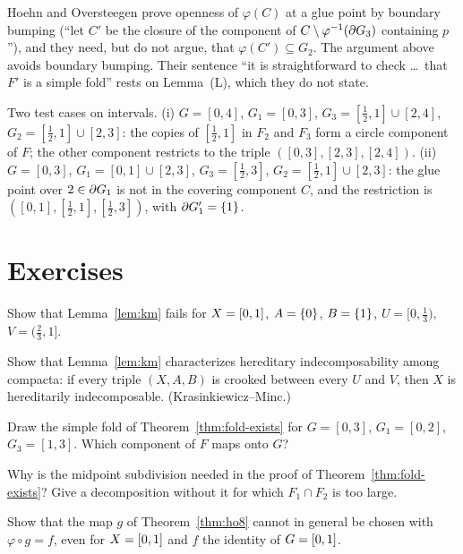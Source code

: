
Hoehn and Oversteegen prove openness of $\varphi(C)$ at a glue point by boundary bumping (``let $C'$ be the closure of the component of $C\setminus\varphi^{-1}(\partial G_3)$
containing $p$''), and they need, but do not argue, that $\varphi(C')\subseteq G_2$. The argument above avoids boundary bumping. Their sentence ``it is straightforward
to check \dots\ that $F'$ is a simple fold'' rests on Lemma~(L), which they do not state.

\begin{example}
Two test cases on intervals. (i) $G=[0,4]$, $G_1=[0,3]$, $G_3=[\frac12,1]\cup[2,4]$, $G_2=[\frac12,1]\cup[2,3]$: the copies of $[\frac12,1]$ in $F_2$ and $F_3$ form a
circle component of $F$; the other component restricts to the triple $([0,3],[2,3],[2,4])$. (ii) $G=[0,3]$, $G_1=[0,1]\cup[2,3]$, $G_3=[\frac12,3]$,
$G_2=[\frac12,1]\cup[2,3]$: the glue point over $2\in\partial G_1$ is not in the covering component $C$, and the restriction is $([0,1],[\frac12,1],[\frac12,3])$, with
$\partial G_1'=\left\{ 1 \right\}$.
\end{example}

\section*{Exercises}

\begin{exercise}
Show that Lemma~\ref{lem:km} fails for $X=[0,1]$, $A=\left\{ 0 \right\}$, $B=\left\{ 1 \right\}$, $U=[0,\frac13)$, $V=(\frac23,1]$.
\end{exercise}

\begin{exercise}
Show that Lemma~\ref{lem:km} characterizes hereditary indecomposability among compacta: if every triple $(X,A,B)$ is crooked between every $U$ and $V$, then
$X$ is hereditarily indecomposable. (Krasinkiewicz--Minc.)
\end{exercise}

\begin{exercise}
Draw the simple fold of Theorem~\ref{thm:fold-exists} for $G=[0,3]$, $G_1=[0,2]$, $G_3=[1,3]$. Which component of $F$ maps onto $G$?
\end{exercise}

\begin{exercise}
Why is the midpoint subdivision needed in the proof of Theorem~\ref{thm:fold-exists}? Give a decomposition without it for which $F_1\cap F_2$ is too large.
\end{exercise}

\begin{exercise}
Show that the map $g$ of Theorem~\ref{thm:ho8} cannot in general be chosen with $\varphi\circ g=f$, even for $X=[0,1]$ and $f$ the identity of $G=[0,1]$.
\end{exercise}
